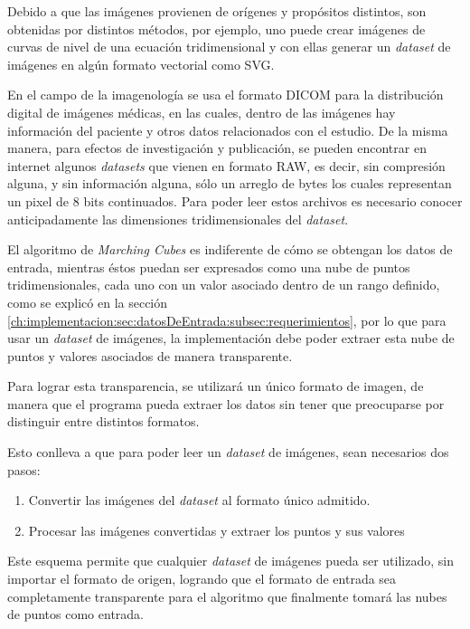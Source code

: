 Debido a que las imágenes provienen de orígenes y propósitos distintos, son obtenidas por distintos métodos, por ejemplo, uno puede crear imágenes de curvas de nivel de una ecuación tridimensional y con ellas generar un \emph{dataset} de imágenes en algún formato vectorial como SVG.

En el campo de la imagenología se usa el formato DICOM para la distribución digital de imágenes médicas, en las cuales, dentro de las imágenes hay información del paciente y otros datos relacionados con el estudio. De la misma manera, para efectos de investigación y publicación, se pueden encontrar en internet algunos \emph{datasets} que vienen en formato RAW, es decir, sin compresión alguna, y sin información alguna, sólo un arreglo de bytes los cuales representan un pixel de 8 bits continuados. Para poder leer estos archivos es necesario conocer anticipadamente las dimensiones tridimensionales del \emph{dataset}.

El algoritmo de \emph{Marching Cubes} es indiferente de cómo se obtengan los datos de entrada, mientras éstos puedan ser expresados como una nube de puntos tridimensionales, cada uno con un valor asociado dentro de un rango definido, como se explicó en la sección \ref{ch:implementacion:sec:datosDeEntrada:subsec:requerimientos}, por lo que para usar un \emph{dataset} de imágenes, la implementación debe poder extraer esta nube de puntos y valores asociados de manera transparente.

Para lograr esta transparencia, se utilizará un único formato de imagen, de manera que el programa pueda extraer los datos sin tener que preocuparse por distinguir entre distintos formatos.

Esto conlleva a que para poder leer un \emph{dataset} de imágenes, sean necesarios dos pasos:

\begin{enumerate}
	\item Convertir las imágenes del \emph{dataset} al formato único admitido.
	\item Procesar las imágenes convertidas y extraer los puntos y sus valores
\end{enumerate}

Este esquema permite que cualquier \emph{dataset} de imágenes pueda ser utilizado, sin importar el formato de origen, logrando que el formato de entrada sea completamente transparente para el algoritmo que finalmente tomará las nubes de puntos como entrada.